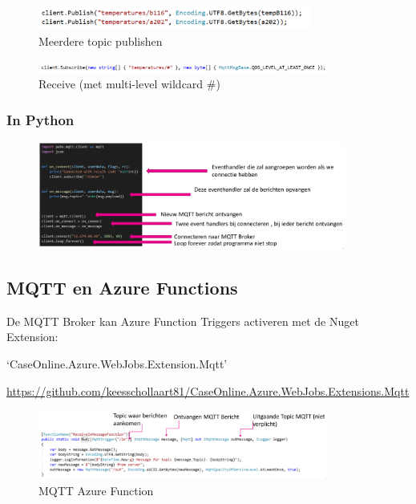 \documentclass{article}
\begin{document}
\begin{figure}[H]
    \centering
    \includegraphics[width=0.8\textwidth]{mqtt-net4.png}
    \caption{Meerdere topic publishen}
\end{figure}

\begin{figure}[H]
    \centering
    \includegraphics[width=0.85\textwidth]{mqtt-net5.png}
    \caption{Receive (met multi-level wildcard \#)}
\end{figure}

\subsubsection{In Python}

\begin{figure}[H]
    \centering
    \includegraphics[width=0.9\textwidth]{mqtt-python.png}
    \caption{}
\end{figure}

\subsection{MQTT en Azure Functions}

De MQTT Broker kan Azure Function Triggers activeren met de Nuget Extension:

`CaseOnline.Azure.WebJobs.Extension.Mqtt'

\url{https://github.com/keesschollaart81/CaseOnline.Azure.WebJobs.Extensions.Mqtt}

\begin{figure}[H]
    \centering
    \includegraphics[width=0.85\textwidth]{mqtt-azurefunction.png}
    \caption{MQTT Azure Function}
\end{figure}
\end{document}

